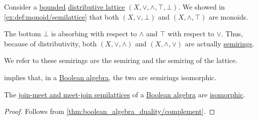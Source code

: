 \begin{definition}\label{def:lattice_as_semiring}\mimprovised
  Consider a \hyperref[def:bounded_lattice]{bounded} \hyperref[def:distributive_lattice]{distributive lattice} \( (X, \vee, \wedge, \top, \bot) \). We showed in \cref{ex:def:monoid/semilattice} that both \( (X, \vee, \bot) \) and \( (X, \wedge, \top) \) are monoids.

  The bottom \( \bot \) is absorbing with respect to \( \wedge \) and \( \top \) with respect to \( \vee \). Thus, because of distributivity, both \( (X, \vee, \wedge) \) and \( (X, \wedge, \vee) \) are actually \hyperref[def:semiring]{semirings}.

  We refer to these semirings are the  semiring and the  semiring of the lattice.
\end{definition}
\begin{comments}
  \item {} implies that, in a \hyperref[def:boolean_algebra]{Boolean algebra}, the two are semirings isomorphic.
\end{comments}

\begin{proposition}\label{thm:boolean_algebra_as_semiring}
  The \hyperref[def:lattice_as_semiring]{join-meet and meet-join semilattices} of a \hyperref[def:boolean_algebra]{Boolean algebra} are \hyperref[def:semiring/morphism]{isomorphic}.
\end{proposition}
\begin{proof}
  Follows from \cref{thm:boolean_algebra_duality/complement}.
\end{proof}

